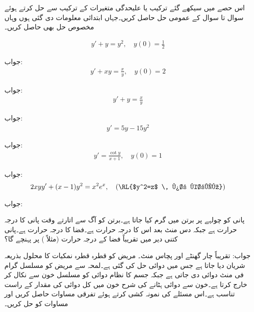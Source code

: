 اس حصے میں سیکھے گئے ترکیب یا علیحدگی متغیرات کے ترکیب سے حل کرتے ہوئے سوال  تا سوال  کے عمومی حل حاصل کریں۔جہاں ابتدائی معلومات دی گئی ہوں وہاں مخصوص حل بھی حاصل کریں۔

\begin{align*}
y'+y=y^2,\quad y(0)=\frac{1}{2}
\end{align*}

جواب:
\begin{align*}
y'+xy=\frac{x}{y},\quad y(0)=2
\end{align*}

جواب:
\begin{align*}
y'+y=\frac{x}{y}
\end{align*}

جواب:
\begin{align*}
y'=5y-15y^2
\end{align*}

جواب:
\begin{align*}
y'=\frac{\cot y}{x+1},\quad y(0)=1
\end{align*}

جواب:
\begin{align*}
2xyy'+(x-1)y^2=x^2e^x,\quad (\text{\RL{$y^2=z$ \, پر کریں}})
\end{align*}

جواب:

پانی کو چولہے پر برتن میں گرم کیا جاتا ہے۔برتن کو آگ سے اتارتے وقت پانی کا درجہ حرارت  ہے جبکہ دس منٹ بعد اس کا درجہ حرارت  ہے۔فضا کا درجہ حرارت  ہے۔پانی کتنی دیر میں تقریباً فضا کے درجہ حرارت (مثلاً ) پر پہنچے گا؟

جواب: تقریباً چار گھنٹے اور پچاس منٹ۔
مریض کو قطرہ قطرہ نمکیات کا محلول بذریعہ شریان دیا جاتا ہے جس میں دوائی حل کی گئی ہے۔لمحہ  سے مریض کو مسلسل  گرام فی منٹ دوائی دی جاتی ہے جبکہ جسم کا نظام دوائی کو مسلسل خون سے نکال کر خارج کرتا ہے۔خون سے دوائی ہٹانے کی شرح خون میں کل دوائی کی مقدار کے راست تناسب ہے۔اس مسئلے کی نمونہ کشی کرتے ہوئے  تفرقی مساوات حاصل کریں اور مساوات کو حل کریں۔

